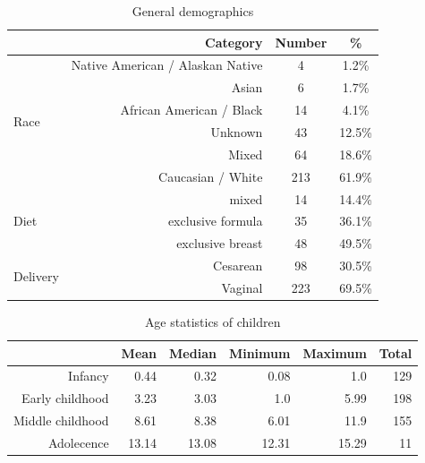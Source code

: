 \documentclass[fleqn,10pt]{wlscirep}
\begin{document}
\begin{table}[ht]
\centering
\begin{tabular}{lrcc}
    \hline\hline
    \textbf{ } & \textbf{Category} & \textbf{Number} & \textbf{\%} \\\hline
    \multirow{6}{*}{Race} & Native American / Alaskan Native & 4 & 1.2\%\\
                          & Asian  & 6 & 1.7\%\\
                          & African American / Black & 14 & 4.1\%\\
                          & Unknown & 43 & 12.5\%\\
                          & Mixed & 64 & 18.6\%\\
                          & Caucasian / White & 213 & 61.9\%\\\hline
    \multirow{3}{*}{Diet} & mixed & 14 & 14.4\%\\
                          & exclusive formula & 35 & 36.1\%\\
                          & exclusive breast & 48 & 49.5\%\\\hline
    \multirow{2}{*}{Delivery} & Cesarean & 98 & 30.5\%\\
                              & Vaginal & 223 & 69.5\%\\
    \hline\hline    
\end{tabular}
\caption{
    General demographics
}
\label{tab:demographics}
\end{table}

\begin{table}[ht]
\centering
\begin{tabular}{rrrrrr}
    \hline\hline
    \textbf{ } & \textbf{Mean} & \textbf{Median} & \textbf{Minimum} & \textbf{Maximum} & \textbf{Total} \\\hline
    Infancy & 0.44 & 0.32 & 0.08 & 1.0 & 129 \\
    Early childhood & 3.23 & 3.03 & 1.0 & 5.99 & 198 \\
    Middle childhood & 8.61 & 8.38 & 6.01 & 11.9 & 155 \\
    Adolecence & 13.14 & 13.08 & 12.31 & 15.29 & 11 \\\hline\hline
\end{tabular}
\caption{
    Age statistics of children
}
\label{tab:agestats}
\end{table}
\end{document}
